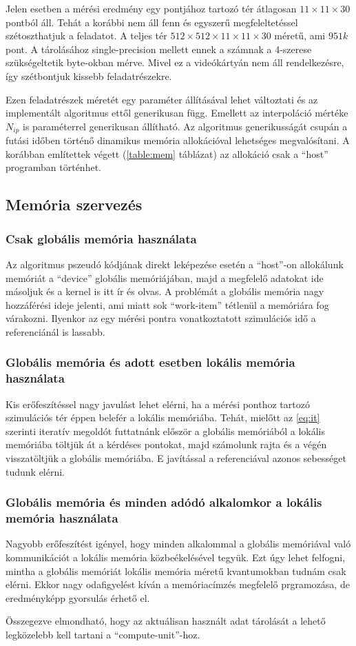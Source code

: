 	Jelen esetben a mérési eredmény egy pontjához tartozó tér átlagosan
	$11\times11\times30$ pontból áll.
	Tehát a korábbi nem áll fenn és egyszerű megfeleltetéssel szétoszthatjuk a
	feladatot.
	A teljes tér $512\times512\times11\times11\times30$ méretű, ami $951k$ pont.
	A tárolásához single-precision mellett ennek a számnak a 4-szerese
	szükségeltetik byte-okban mérve. Mivel ez a videókártyán nem áll
	rendelkezésre, így szétbontjuk kissebb feladatrészekre.
	
	Ezen feladatrészek méretét egy paraméter állításával lehet változtati és az
	implementált algoritmus ettől generikusan függ.
	Emellett az interpoláció mértéke $N_{ip}$ is paraméterrel generikusan állítható.
	Az algoritmus generikusságát csupán a futási időben történő dinamikus memória
	allokációval lehetséges megvalósítani. A korábban említettek végett (\ref{table:mem} táblázat)
	az allokáció csak a ``host'' programban történhet.

\subsection{Memória szervezés}
	\subsubsection{Csak globális memória használata}
	Az algoritmus pszeudó kódjának direkt leképezése esetén a ``host''-on
	allokálunk memóriát a ``device'' globális memóriájában,
	majd a megfelelő adatokat ide másoljuk és a kernel is itt ír és olvas.
	A problémát a globális memória nagy hozzáférési ideje jelenti, ami miatt sok
	``work-item'' tétlenül a memóriára fog várakozni.
	Ilyenkor az egy mérési pontra vonatkoztatott szimulációs idő a
	referenciánál is lassabb.
	\subsubsection{Globális memória és adott esetben lokális memória használata}
	Kis erőfeszítéssel nagy javulást lehet elérni, ha a mérési ponthoz tartozó
	szimulációs tér éppen belefér a lokális memóriába.
	Tehát, mielőtt az \eqref{eq:it} szerinti iteratív megoldót futtatnánk először a
	globális memóriából a lokális memóriába töltjük át a kérdéses pontokat, majd
	számolunk rajta és a végén visszatöltjük a globális memóriába.
	E javítással a referenciával azonos sebességet tudunk elérni.
	\subsubsection{Globális memória és minden adódó alkalomkor a lokális memória használata}
	Nagyobb erőfeszítést igényel, hogy minden alkalommal a globális memóriával való kommunikációt a
	lokális memória közbeékelésével tegyük.
	Ezt úgy lehet felfogni, mintha a globális memóriát lokális memória méretű
	kvantumokban tudnám csak elérni.
	Ekkor nagy odafigyelést kíván a memóriacímzés megfelelő prgramozása, de
	eredményképp gyorsulás érhető el. \\
	
	\noindent
	\begin{center}
	Összegezve elmondható, hogy az aktuálisan használt adat tárolását a lehető
	legközelebb kell tartani a ``compute-unit''-hoz.
	\end{center}